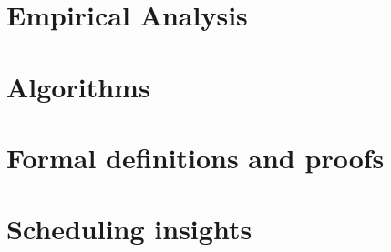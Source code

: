 \documentclass[USenglish,oneside,twocolumn]{article}
\begin{document}



%
\appendix
\section{Empirical Analysis}
\label{sec:analysis}


\section{Algorithms}
\label{sec:algorithms}


\section{Formal definitions and proofs}
\label{sec:proof}



\section{Scheduling insights}
\label{sec:scheduling}


\end{document}
